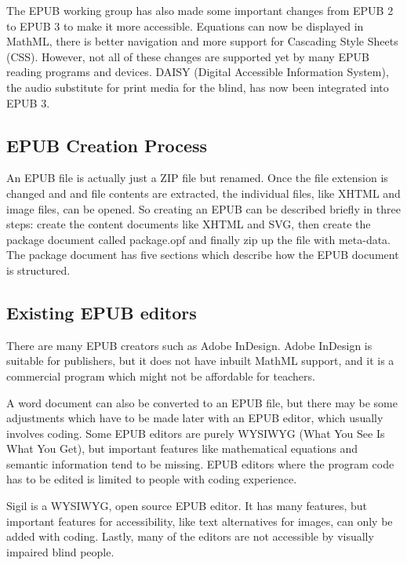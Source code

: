\documentclass{llncs}
\begin{document}
The EPUB working group has also made some important changes from EPUB 2 to EPUB 3  to make it more accessible. Equations can now be displayed in MathML, there is better navigation and more support for Cascading Style Sheets (CSS). However, not all of these changes are supported yet by many EPUB reading programs and devices.\cite{EPUB30changes} DAISY (Digital Accessible Information System), the audio substitute for print media for the blind, has now been integrated into EPUB 3.\cite{daisyAccessibility}

\subsection{EPUB Creation Process}
An EPUB file is actually just a ZIP file but renamed.\cite{WhatIsEpub3} Once the file extension is changed and and file contents are extracted, the individual files, like XHTML and image files, can be opened. So creating an EPUB can be described briefly in three steps: create the content documents like XHTML and SVG, then create the package document  called package.opf and finally zip up the file with meta-data.
The package document has five sections which describe how the EPUB document is structured.\cite{EPUB3bp}

\subsection{Existing EPUB editors}
There are many EPUB creators such as Adobe InDesign. Adobe InDesign is suitable for publishers, but it does not have inbuilt MathML support, and it is a commercial program which might not be affordable for teachers.


A word document can also be converted to an EPUB file, but there may be some adjustments which have to be made later with an EPUB editor, which usually involves coding. 
Some EPUB editors are purely WYSIWYG (What You See Is What You Get), but important features like mathematical equations and semantic information tend to be missing. EPUB editors where the program code has to be edited is limited to people with coding experience.

Sigil is a WYSIWYG, open source EPUB editor.\cite{Sigil} It has many features, but important features for accessibility, like text alternatives for images, can only be added with coding.
Lastly, many of the editors are not accessible by visually impaired blind people. 
\end{document}
